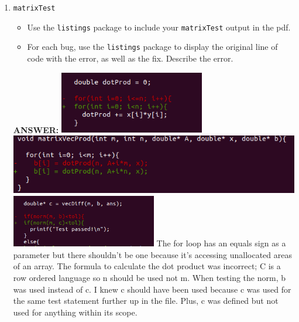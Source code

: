 \begin{enumerate}
    \item \texttt{matrixTest}
    \begin{itemize}
        \item Use the \texttt{listings} package to include your \texttt{matrixTest} output in the pdf.
        \item For each bug, use the \texttt{listings} package to display the original line of code with the error, as well as the fix.  Describe the error.            
    \end{itemize}
    \textbf{ANSWER:} 
    \includegraphics[width=0.5\textwidth]{Bug1.png} \newline
    \includegraphics[width=\textwidth]{Bug3.png} \newline
    \includegraphics[width=0.5\textwidth]{Bug4.png} \newline
    The for loop has an equals sign as a parameter but there shouldn't be one because it's accessing unallocated areas of an array. \newline
    The formula to calculate the dot product was incorrect; C is a row ordered language so n should be used not m. \newline
    When testing the norm, b was used instead of c. I knew c should have been used because c was used for the same test statement further up in the file. Plus, c was defined but not used for anything within its scope.


\end{enumerate}
